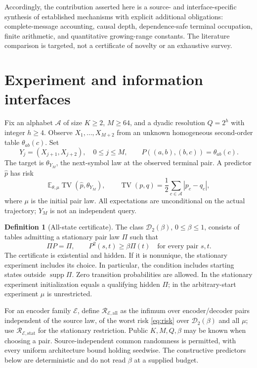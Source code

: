 \documentclass[11pt,letterpaper]{article}
\theoremstyle{definition}\newtheorem{definition}[theorem]{Definition}
\theoremstyle{remark}\newtheorem{remark}[theorem]{Remark}
\newcommand{\TV}{\operatorname{TV}}
\newcommand{\E}{\mathbb{E}}
\newcommand{\Risk}{\mathcal{R}}
\newcommand{\Dclass}{\mathcal{D}_2(\beta)}
\newcommand{\supp}{\operatorname{supp}}
\begin{document}
Accordingly, the contribution asserted here is a source- and interface-specific synthesis of established mechanisms with explicit additional obligations: complete-message accounting, causal depth, dependence-safe terminal occupation, finite arithmetic, and quantitative growing-range constants. The literature comparison is targeted, not a certificate of novelty or an exhaustive survey.

\section{Experiment and information interfaces}\label{sec:experiment}
Fix an alphabet $\mathcal A$ of size $K\ge2$, $M\ge64$, and a dyadic resolution $Q=2^h$ with integer $h\ge4$. Observe $X_1,\ldots,X_{M+2}$ from an unknown homogeneous second-order table $\theta_{ab}(c)$. Set
\[
 Y_j=(X_{j+1},X_{j+2}),\quad 0\le j\le M,
 \qquad P((a,b),(b,c))=\theta_{ab}(c).
\]
The target is $\theta_{Y_M}$, the next-symbol law at the observed terminal pair. A predictor $\widehat p$ has risk
\begin{equation}\label{eq:risk}
 \E_{\theta,\mu}\TV(\widehat p,\theta_{Y_M}),
 \qquad \TV(p,q)=\frac12\sum_{c\in\mathcal A}|p_c-q_c|,
\end{equation}
where $\mu$ is the initial pair law. All expectations are unconditional on the actual trajectory; $Y_M$ is not an independent query.

\begin{definition}[All-state certificate]
The class $\Dclass$, $0\le\beta\le1$, consists of tables admitting a stationary pair law $\Pi$ such that
\begin{equation}\label{eq:minor}
 \Pi P=\Pi,\qquad P^2(s,t)\ge\beta\Pi(t)\quad\text{for every pair }s,t.
\end{equation}
The certificate is existential and hidden. If it is nonunique, the stationary experiment includes its choice. In particular, the condition includes starting states outside $\supp\Pi$. Zero transition probabilities are allowed. In the stationary experiment initialization equals a qualifying hidden $\Pi$; in the arbitrary-start experiment $\mu$ is unrestricted.
\end{definition}

For an encoder family $\mathcal E$, define $\Risk_{\mathcal E,\mathrm{all}}$ as the infimum over encoder/decoder pairs independent of the source law, of the worst risk \eqref{eq:risk} over $\Dclass$ and all $\mu$; use $\Risk_{\mathcal E,\mathrm{stat}}$ for the stationary restriction. Public $K,M,Q,\beta$ may be known when choosing a pair. Source-independent common randomness is permitted, with every uniform architecture bound holding seedwise. The constructive predictors below are deterministic and do not read $\beta$ at a supplied budget.
\end{document}
